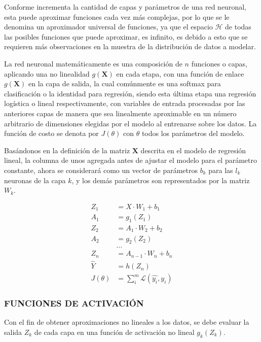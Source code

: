         Conforme incrementa la cantidad de capas y parámetros de una red neuronal, esta puede aproximar funciones cada vez más complejas, por lo que se le denomina un aproximador universal de funciones, ya que el espacio $\mathcal{H}$ de todas las posibles funciones que puede aproximar, es infinito, es debido a esto que se requieren más observaciones en la muestra de la distribución de datos a modelar. \citep{Goodfellow-et-al-2016}
        
        La red neuronal matemáticamente es una composición de $n$ funciones o capas, aplicando una no linealidad $g(\mathbf{X})$ en cada etapa, con una función de enlace $g(\mathbf{X})$ en la capa de salida, la cual comúnmente es una softmax para clasificación o la identidad para regresión, siendo esta última etapa una regresión logística o lineal respectivamente, con variables de entrada procesadas por las anteriores capas de manera que sea linealmente aproximable en un número arbitrario de dimensiones elegidas por el modelo al entrenarse sobre los datos. La función de costo se denota por $J(\theta)$ con $\theta$ todos los parámetros del modelo. \citep{bishop}
        
        Basándonos en la definición de la matriz $\mathbf{X}$ descrita en el modelo de regresión lineal, la columna de unos agregada antes de ajustar el modelo para el parámetro constante, ahora se considerará como un vector de parámetros $b_k$ para las $l_k$ neuronas de la capa $k$, y los demás parámetros son representados por la matriz $W_k$.
        
        \begin{equation}
	        \begin{aligned}
	            Z_1 &= X \cdot W_1 + b_1\\
	    		A_1 &= g_1(Z_1) \\
	    		Z_2 &= A_1 \cdot W_2 + b_2 \\
	    		A_2 &= g_2(Z_2) \\
	    		&\dots\\
	    		Z_n &= A_{n-1} \cdot W_n + b_n\\
	    		\hat{Y} &= h(Z_n) \\
	    		J(\theta) &= \sum_{i}^{m} \mathcal{L}(\hat{y_i}, y_i)
	        \end{aligned}
        \end{equation}
        
        
        
        \subsubsection{FUNCIONES DE ACTIVACIÓN}
        Con el fin de obtener aproximaciones no lineales a los datos, se debe evaluar la salida $Z_k$ de cada capa en una función de activación no lineal $g_k(Z_k)$.
        
